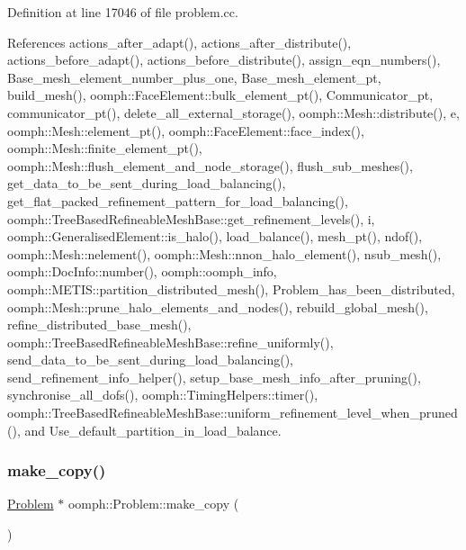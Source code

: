 Definition at line 17046 of file problem.\+cc.



References actions\+\_\+after\+\_\+adapt(), actions\+\_\+after\+\_\+distribute(), actions\+\_\+before\+\_\+adapt(), actions\+\_\+before\+\_\+distribute(), assign\+\_\+eqn\+\_\+numbers(), Base\+\_\+mesh\+\_\+element\+\_\+number\+\_\+plus\+\_\+one, Base\+\_\+mesh\+\_\+element\+\_\+pt, build\+\_\+mesh(), oomph\+::\+Face\+Element\+::bulk\+\_\+element\+\_\+pt(), Communicator\+\_\+pt, communicator\+\_\+pt(), delete\+\_\+all\+\_\+external\+\_\+storage(), oomph\+::\+Mesh\+::distribute(), e, oomph\+::\+Mesh\+::element\+\_\+pt(), oomph\+::\+Face\+Element\+::face\+\_\+index(), oomph\+::\+Mesh\+::finite\+\_\+element\+\_\+pt(), oomph\+::\+Mesh\+::flush\+\_\+element\+\_\+and\+\_\+node\+\_\+storage(), flush\+\_\+sub\+\_\+meshes(), get\+\_\+data\+\_\+to\+\_\+be\+\_\+sent\+\_\+during\+\_\+load\+\_\+balancing(), get\+\_\+flat\+\_\+packed\+\_\+refinement\+\_\+pattern\+\_\+for\+\_\+load\+\_\+balancing(), oomph\+::\+Tree\+Based\+Refineable\+Mesh\+Base\+::get\+\_\+refinement\+\_\+levels(), i, oomph\+::\+Generalised\+Element\+::is\+\_\+halo(), load\+\_\+balance(), mesh\+\_\+pt(), ndof(), oomph\+::\+Mesh\+::nelement(), oomph\+::\+Mesh\+::nnon\+\_\+halo\+\_\+element(), nsub\+\_\+mesh(), oomph\+::\+Doc\+Info\+::number(), oomph\+::oomph\+\_\+info, oomph\+::\+M\+E\+T\+I\+S\+::partition\+\_\+distributed\+\_\+mesh(), Problem\+\_\+has\+\_\+been\+\_\+distributed, oomph\+::\+Mesh\+::prune\+\_\+halo\+\_\+elements\+\_\+and\+\_\+nodes(), rebuild\+\_\+global\+\_\+mesh(), refine\+\_\+distributed\+\_\+base\+\_\+mesh(), oomph\+::\+Tree\+Based\+Refineable\+Mesh\+Base\+::refine\+\_\+uniformly(), send\+\_\+data\+\_\+to\+\_\+be\+\_\+sent\+\_\+during\+\_\+load\+\_\+balancing(), send\+\_\+refinement\+\_\+info\+\_\+helper(), setup\+\_\+base\+\_\+mesh\+\_\+info\+\_\+after\+\_\+pruning(), synchronise\+\_\+all\+\_\+dofs(), oomph\+::\+Timing\+Helpers\+::timer(), oomph\+::\+Tree\+Based\+Refineable\+Mesh\+Base\+::uniform\+\_\+refinement\+\_\+level\+\_\+when\+\_\+pruned(), and Use\+\_\+default\+\_\+partition\+\_\+in\+\_\+load\+\_\+balance.

\mbox{\label{classoomph_1_1Problem_a78ac2b1d2483f49198203e192d3b2871}} 
\subsubsection{\texorpdfstring{make\+\_\+copy()}{make\_copy()}}
{\footnotesize\ttfamily \hyperlink{classoomph_1_1Problem}{Problem} $\ast$ oomph\+::\+Problem\+::make\+\_\+copy (\begin{DoxyParamCaption}{ }\end{DoxyParamCaption})\hspace{0.3cm}{\ttfamily [virtual]}}



